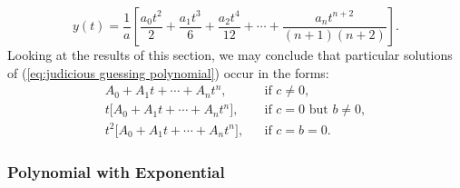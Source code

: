 \documentclass{myart}
\newcommand{\eq}[1]{(\ref{eq:#1})}
\begin{document}
\begin{equation*}
y(t) = \frac{1}{a} \left[\frac{a_0t^2}{2} + \frac{a_1t^3}{6} + \frac{a_2t^4}{12} + \cdots + \frac{a_nt^{n+2}}{(n+1)(n+2)}\right].
\end{equation*}
Looking at the results of this section, we may conclude that particular solutions of \eq{judicious guessing polynomial} occur in the forms:
\begin{align*}
A_0 + A_1t + \cdots + A_nt^n, && \text{if $c \neq 0$}, \\
t\Big[A_0 + A_1t + \cdots + A_nt^n\Big], && \text{if $c = 0$ but $b \neq 0$}, \\
t^2\Big[A_0 + A_1t + \cdots + A_nt^n\Big], && \text{if $c = b = 0$}.
\end{align*}

\subsubsection{Polynomial with Exponential} \label{subsubsec:judicious guessing exponential}
\end{document}
